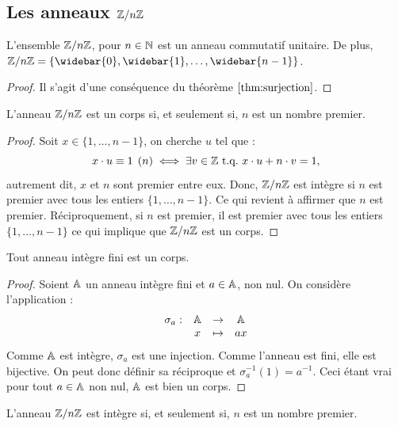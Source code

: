 \subsection{Les anneaux $\mathbb{Z}/n\mathbb{Z}$}

\begin{thm}
L'ensemble $\mathbb{Z}/n\mathbb{Z}$, pour $n \in \mathbb{N}$ est un anneau commutatif unitaire. 
De plus, $\Z/n\Z = \{\widebar{0}, \widebar{1}, \dots, \widebar{n-1} \}$.
\end{thm}

\begin{proof}
Il s'agit d'une conséquence du théorème $\ref{thm:surjection}$.
\end{proof}

\begin{thm}
L'anneau $\mathbb{Z}/n\mathbb{Z}$ est un corps si, et seulement si, $n$ est un nombre premier.
\end{thm}

\begin{proof}
Soit $x \in \{1, \dots, n-1\}$, on cherche $u$ tel que :
\[ x \cdot u \equiv 1 \pod{n} \iff \exists v \in \mathbb{Z} \text{~t.q.~} x \cdot u + n \cdot v = 1, \]
autrement dit, $x$ et $n$ sont premier entre eux.
Donc, $\mathbb{Z}/n\mathbb{Z}$ est intègre si $n$ est premier avec tous les entiers $\{1, \dots, n-1\}$. 
Ce qui revient à affirmer que $n$ est premier. \newline
Réciproquement, si $n$ est premier, il est premier avec tous les entiers $\{1, \dots, n-1\}$ ce qui implique que $\mathbb{Z}/n\mathbb{Z}$ est un corps.
\end{proof}

\begin{lem}
Tout anneau intègre fini est un corps.
\end{lem}

\begin{proof}
Soient $\mathbb{A}$ un anneau intègre fini et $a \in \mathbb{A}$, non nul. On considère l'application :
\[ \begin{array}{c c c c}
\sigma_a : & \mathbb{A} & \to & \mathbb{A} \\
& x & \mapsto & ax
\end{array} \]
Comme $\mathbb{A}$ est intègre, $\sigma_a$ est une injection. Comme l'anneau est fini, elle est bijective.
On peut donc définir sa réciproque et $\sigma_a^{-1}(1) = a^{-1}$. Ceci étant vrai pour tout $a \in \mathbb{A}$ non nul, $\mathbb{A}$ est bien un corps.
\end{proof}

\begin{coro}
\label{coro:integrZnZ}
L'anneau $\mathbb{Z}/n\mathbb{Z}$ est intègre si, et seulement si, $n$ est un nombre premier.
\end{coro}

